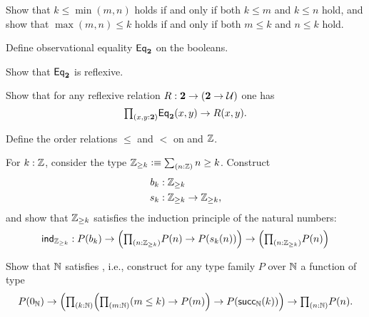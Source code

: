\begin{exercises}
\begin{subexenum}
  \item Show that $k\leq \min(m,n)$ holds if and only if both $k\leq m$ and $k\leq n$ hold, and show that $\max(m,n)\leq k$ holds if and only if both $m\leq k$ and $n\leq k$ hold.
  \end{subexenum}
\item \label{ex:obs_bool}
  \begin{subexenum}
  \item Define observational equality $\mathsf{Eq}_\mathbf{2}$ on the booleans.
  \item Show that $\mathsf{Eq}_\mathbf{2}$ is reflexive.
  \item Show that for any reflexive relation $R:\mathbf{2}\to(\mathbf{2}\to \mathcal{U})$ one has
    \begin{equation*}
      \prd{x,y:\bool} \mathsf{Eq}_\bool(x,y)\to R(x,y).
    \end{equation*}
  \end{subexenum}
\item \label{ex:int_order}
  \begin{subexenum}
  \item Define the order relations $\leq$ and $<$ on and ${\mathbb{Z}}$.
  \item For $k:{\mathbb{Z}}$, consider the type $\Z_{\geq k}\defeq \sm{n:\Z}n\geq k$. Construct
    \begin{align*}
      b_k & : {\mathbb{Z}}_{\geq k} \\
      s_k & : {\mathbb{Z}}_{\geq k}\to{\mathbb{Z}}_{\geq k},
    \end{align*}
    and show that ${\mathbb{Z}}_{\geq k}$ satisfies the induction principle of the natural numbers:
    \begin{equation*}
      \ind{\Z_{\geq k}} : P(b_k)\to \Big(\prd{n:\Z_{\geq k}} P(n)\to P(s_k(n))\Big)\to \Big(\prd{n:\Z_{\geq k}} P(n)\Big)
    \end{equation*}
  \end{subexenum}
\item
  \begin{subexenum}
  \item Show that ${\mathbb{N}}$ satisfies , i.e., construct for any type family $P$ over ${\mathbb{N}}$ a function of type
    \begin{equation*}
      P(\zeroN) \to \Big(\prd{k:\N}\Big(\prd{m:\N} (m\leq k) \to P(m)\Big)\to P(\succN(k))\Big) \to \prd{n:\N}P(n).

\end{equation*}
\end{subexenum}
\end{exercises}
